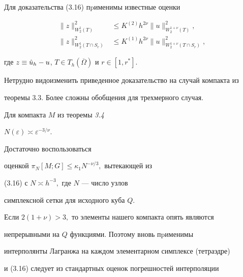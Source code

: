 \begin{pf}
Для доказательства (3.16) пpименимы известные оценки


\begin{align*}


\|z\|^2_{W_2^1(T)} &\le K^{(2)}h^{2\nu}\|u\|^2_{W_2^{1+\nu}(T)},\\


%


\|z\|^2_{W_2^1(T\cap S_r)} &\le


K^{(1)}h^{2\nu}\|u\|^2_{W_2^{1+\nu}(T\cap S_r)},


\end{align*}


где $z \equiv \Hat u_h-u$, $T\in T_h(\overline \Omega)$ и $r\in[1,r^*]$.


\end{pf}





Нетрудно видоизменить приведенное доказательство на случай компакта из


теоремы 3.3. Более сложны обобщения для трехмер\-ного случая.





\begin{thmm} Для компакта $M$ из теоремы {\em 3.4}


$N(\varepsilon)\asymp \varepsilon^{-3/{\nu}}.$


\end{thmm}





\begin{pf} Достаточно воспользоваться


оценкой $\pi_N[M;G]\le \kappa_1N^{-\nu/3},$ вытекающей из


(3.16) с $N\asymp h^{-3},$ где $N$ --- число узлов


симплексной сетки для исходного куба $Q$.


\end{pf}





Если $2(1+\nu)>3,$ то элементы нашего компакта опять являются


непрерывными на $Q$ функциями. Поэтому вновь пpименимы


интерполянты Лагранжа на каждом элементарном симплексе (те\-траэдре)


и (3.16) следует из стандартных оценок погрешностей инте\-рполяции


